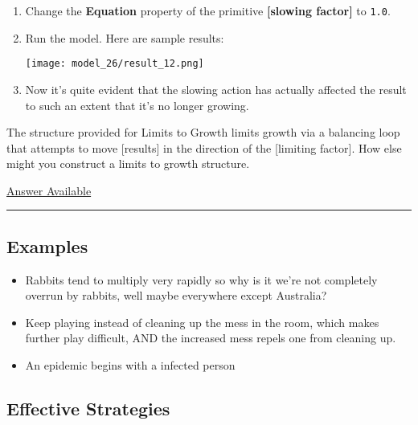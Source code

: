\documentclass[]{memoir}
\makeatletter
\def\maxwidth{\ifdim\Gin@nat@width>\linewidth\linewidth
\else\Gin@nat@width\fi}
\let\Oldincludegraphics\includegraphics
\renewcommand{\includegraphics}[1]{\Oldincludegraphics[width=\maxwidth]{#1}}
\newcommand{\p}[1]{\textbf{{[}#1{]}}}
\newcommand{\e}[1]{\texttt{#1}}
\renewcommand{\a}[1]{\textbf{#1}}
\makeatother
\begin{document}
\begin{oframed}
\begin{enumerate}
\item  Change the \a{Equation} property of the primitive \p{slowing factor} to \e{1.0}.
\item Run the model. Here are sample results:\par \begin{minipage}{\linewidth}  \centering \texttt{[image: model\_26/result\_12.png]}
\end{minipage}
\item 

Now it's quite evident that the slowing action has actually affected the result to such an extent that it's no longer growing.



\end{enumerate} \end{oframed}


The structure provided for Limits to Growth limits growth via a
balancing loop that attempts to move {[}results{]} in the direction of
the {[}limiting factor{]}. How else might you construct a limits to
growth structure.

\hyperref[Ans-5-5]{Answer Available}

\begin{center}\rule{3in}{0.4pt}\end{center}

\subsection{Examples}

\begin{itemize}
\itemsep1pt\parskip0pt
\item
  Rabbits tend to multiply very rapidly so why is it we're not
  completely overrun by rabbits, well maybe everywhere except Australia?
\item
  Keep playing instead of cleaning up the mess in the room, which makes
  further play difficult, AND the increased mess repels one from
  cleaning up.
\item
  An epidemic begins with a infected person
\end{itemize}

\subsection{Effective Strategies}
\end{document}
